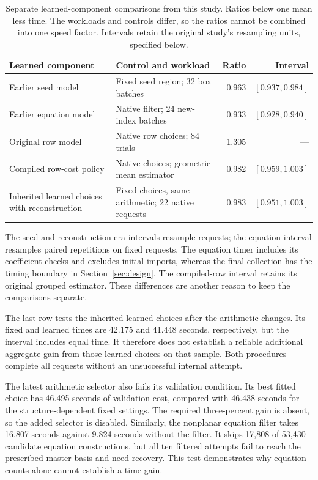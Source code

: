 \begin{table}[!htbp]\centering\small
\caption{Separate learned-component comparisons from this study. Ratios below one mean less time. The workloads and controls differ, so the ratios cannot be combined into one speed factor. Intervals retain the original study's resampling units, specified below.}
\label{tab:ml-results}
\begin{tabularx}{\linewidth}{@{}YYrr@{}}\toprule
Learned component & Control and workload & Ratio & Interval\\\midrule
Earlier seed model & Fixed seed region; 32 box batches & 0.963 & $[0.937,0.984]$\\
Earlier equation model & Native filter; 24 new-index batches & 0.933 & $[0.928,0.940]$\\
Original row model & Native row choices; 84 trials & 1.305 & ---\\
Compiled row-cost policy & Native choices; geometric-mean estimator & 0.982 & $[0.959,1.003]$\\
Inherited learned choices with reconstruction & Fixed choices, same arithmetic; 22 native requests & 0.983 & $[0.951,1.003]$\\\bottomrule
\end{tabularx}
\end{table}
The seed and reconstruction-era intervals resample requests; the equation interval resamples paired repetitions on fixed requests. The equation timer includes its coefficient checks and excludes initial imports, whereas the final collection has the timing boundary in Section~\ref{sec:design}. The compiled-row interval retains its original grouped estimator. These differences are another reason to keep the comparisons separate.

The last row tests the inherited learned choices after the arithmetic changes. Its fixed and learned times are 42.175 and 41.448 seconds, respectively, but the interval includes equal time. It therefore does not establish a reliable additional aggregate gain from those learned choices on that sample. Both procedures complete all requests without an unsuccessful internal attempt.

The latest arithmetic selector also fails its validation condition. Its best fitted choice has 46.495 seconds of validation cost, compared with 46.438 seconds for the structure-dependent fixed settings. The required three-percent gain is absent, so the added selector is disabled. Similarly, the nonplanar equation filter takes 16.807 seconds against 9.824 seconds without the filter. It skips 17,808 of 53,430 candidate equation constructions, but all ten filtered attempts fail to reach the prescribed master basis and need recovery. This test demonstrates why equation counts alone cannot establish a time gain.

